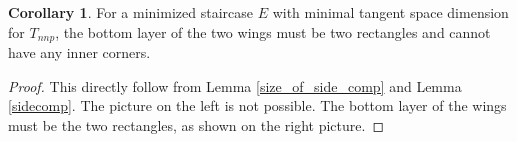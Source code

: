 \documentclass{amsart}[10pt]
\theoremstyle{plain}
\theoremstyle{definition}
\newtheorem{corollary}[theorem]{Corollary}
\begin{document}
\begin{corollary}
\label{bot_rec_wings}
For a minimized staircase $E$ with minimal tangent space dimension for $T_{nnp}$, the bottom layer of the two wings must be two rectangles and cannot have any inner corners.
\end{corollary}

\begin{proof}
This directly follow from Lemma \ref{size_of_side_comp} and Lemma \ref{sidecomp}. The picture on the left is not possible. The bottom layer of the wings must be the two rectangles, as shown on the right picture.%
\end{proof}
\end{document}
